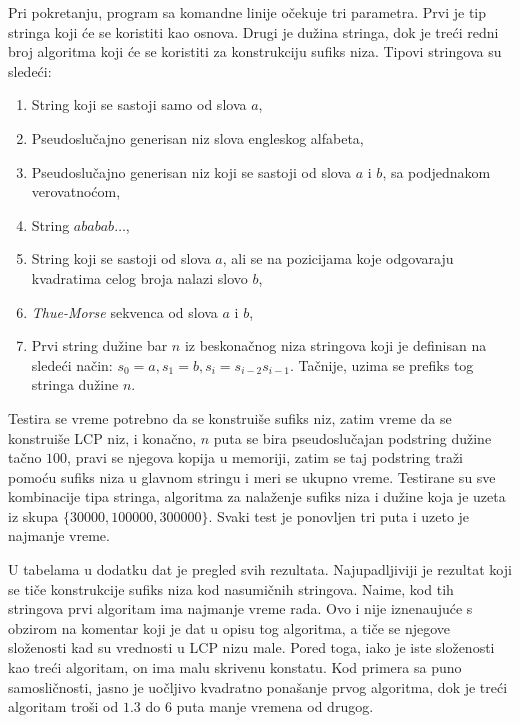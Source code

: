 
Pri pokretanju, program sa komandne linije o\v cekuje tri parametra. Prvi je tip stringa koji \' ce se koristiti kao osnova. Drugi je du\v zina stringa, dok je tre\' ci redni broj algoritma koji \' ce se koristiti za konstrukciju sufiks niza. Tipovi stringova su slede\' ci:

\begin{enumerate}
    \item String koji se sastoji samo od slova $a$,
    \item Pseudoslu\v cajno generisan niz slova engleskog alfabeta,
    \item Pseudoslu\v cajno generisan niz koji se sastoji od slova $a$ i $b$, sa podjednakom verovatno\' com,
    \item String $ababab\ldots$,
    \item String koji se sastoji od slova $a$, ali se na pozicijama koje odgovaraju kvadratima celog broja nalazi slovo $b$,
    \item \textit{Thue-Morse} sekvenca \cite{thuemorse} od slova $a$ i $b$,
    \item Prvi string du\v zine bar $n$ iz beskona\v cnog niza stringova koji je definisan na slede\' ci na\v cin: $s_0 = a, s_1 = b, s_i = s_{i-2}s_{i-1}$. Ta\v cnije, uzima se prefiks tog stringa du\v zine $n$.
\end{enumerate}

Testira se vreme potrebno da se konstrui\v se sufiks niz, zatim vreme da se konstrui\v se LCP niz, i kona\v cno, $n$ puta se bira pseudoslu\v cajan podstring du\v zine ta\v cno $100$, pravi se njegova kopija u memoriji, zatim se taj podstring tra\v zi pomo\' cu sufiks niza u glavnom stringu i meri se ukupno vreme. Testirane su sve kombinacije tipa stringa, algoritma za nala\v zenje sufiks niza i du\v zine koja je uzeta iz skupa $\{30000, 100000, 300000\}$. Svaki test je ponovljen tri puta i uzeto je najmanje vreme.


U tabelama u dodatku \sirdodataktabele{} dat je pregled svih rezultata. Najupadljiviji je rezultat koji se ti\v ce konstrukcije sufiks niza kod nasumi\v cnih stringova. Naime, kod tih stringova prvi algoritam ima najmanje vreme rada. Ovo i nije iznena\dj uju\' ce s obzirom na komentar koji je dat u opisu tog algoritma, a ti\v ce se njegove slo\v zenosti kad su vrednosti u LCP nizu male. Pored toga, iako je iste slo\v zenosti kao tre\' ci algoritam, on ima malu skrivenu konstatu. Kod primera sa puno samosli\v cnosti, jasno je uo\v cljivo kvadratno pona\v sanje prvog algoritma, dok je tre\' ci algoritam tro\v si od $1.3$ do $6$ puta manje vremena od drugog.

